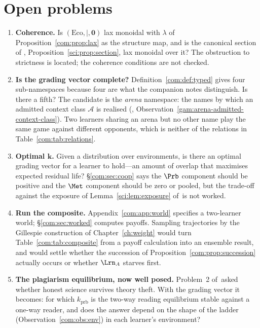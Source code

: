 \section{Open problems}\label{com:S15}

\begin{enumerate}[itemsep=4pt]
\item \textbf{Coherence.} Is $(\mathrm{Eco}, \mid, \mathbf{0})$ lax monoidal with
$\lambda$ of Proposition~\ref{com:prop:lax} as the structure map, and is the canonical section of
\chSci, Proposition~\ref{sci:prop:section}, lax monoidal over it? The obstruction to strictness is located; the
coherence conditions are not checked.

\item \textbf{Is the grading vector complete?} Definition~\ref{com:def:typed} gives four
sub-namespaces because four are what the companion notes distinguish. Is there a fifth? The
candidate is the \emph{arena} namespace: the names by which an admitted context class
$\mathcal{A}$ is realised (\chGame, Observation~\ref{gam:arena-admitted-context-class}). Two learners sharing an arena but no other name
play the same game against different opponents, which is neither of the relations in
Table~\ref{com:tab:relations}.

\item \textbf{Optimal $\mathbf{k}$.} Given a distribution over environments, is there an optimal
grading vector for a learner to hold---an amount of overlap that maximises expected residual
life? \S\ref{com:sec:coop} says the $\Prb$ component should be positive and the $\Met$ component
should be zero or pooled, but the trade-off against the exposure of Lemma~\ref{sci:lem:exposure}
of~\chSci is not worked.

\item \textbf{Run the composite.} Appendix~\ref{com:app:world} specifies a two-learner world;
\S\ref{com:sec:worked} computes payoffs. Sampling trajectories by the Gillespie construction
of Chapter~\ref{ch:weight} would turn Table~\ref{com:tab:composite} from a payoff calculation into an
ensemble result, and would settle whether the succession of Proposition~\ref{com:prop:succession}
actually occurs or whether $\Lrn_A$ starves first.

\item \textbf{The plagiarism equilibrium, now well posed.} Problem~2 of~\chSci asked
whether honest science survives theory theft. With the grading vector it becomes: for which
$k_{\mathrm{prb}}$ is the two-way reading equilibrium stable against a one-way reader, and does
the answer depend on the shape of the ladder (Observation~\ref{com:obs:env}) in each learner's
environment?


\end{enumerate}
